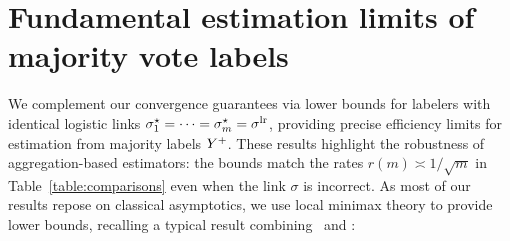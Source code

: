 
\newcommand{\fisher}{\mathsf{I}}
\newcommand{\fishermv}{\fisher\mv}

\section{Fundamental estimation limits of majority vote labels}
\label{sec:lower-bound}
\label{sec:lam-majority-vote}

We complement our convergence guarantees via lower bounds for labelers with
identical logistic links $\sigma_1^\star = \dots = \sigma_m^\star = \sigma^{\textup{lr}}$,
providing precise efficiency limits for estimation
from majority labels $Y^+$.
%
%
These results highlight the robustness of aggregation-based
estimators: the bounds match the rates $r(m) \asymp 1/\sqrt{m}$ in
Table~\ref{table:comparisons} even when the link $\sigma$ is
incorrect.
%
As most of our results repose on classical asymptotics, we use local
minimax theory to provide lower bounds,
recalling a typical result combining~\citep[Lemma
6.6.5]{LeCamYa00} and \citep[Theorem 3.11.5]{VanDerVaartWe96}:

%


